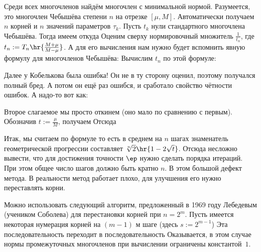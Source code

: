 \documentclass[a4paper]{article}
\begin{document}
Среди всех многочленов найдём многочлен с минимальной
нормой. Разумеется, это многочлен Чебышёва степени $n$ на отрезке
$[\mu,M]$.  Автоматически получаем $n$ корней и $n$ значений
параметров $\tau_k$. Пусть $t_k$ нули стандартного многочлена
Чебышёва.  Тогда имеем  откуда   Оценим сверху нормировочный множитель
$\frac{1}{t_n}$, где $t_n := T_n\hr{\frac{M + \mu}{M - \mu}}$.  А для
его вычисления нам нужно будет вспомнить явную формулу для многочленов
Чебышёва:   Вычислим $t_n$ по этой формуле: 
\begin{petit}
Далее у Кобелькова была ошибка! Он не в ту сторону оценил, поэтому
получался полный бред.  А потом он ещё раз ошибся, и сработало
свойство чётности ошибок.  А надо-то вот как:
\end{petit}
Второе слагаемое мы просто откинем (оно мало по сравнению с первым).
Обозначив $t := \frac{\mu}{M}$, получаем   Отсюда

Итак, мы считаем по формуле  то есть в среднем на $n$
шагах знаменатель геометрической прогрессии составляет
$\sqrt[n]{2}\hr{1-2\sqrt t}$.  Отсюда несложно вывести, что для
достижения точности $\ep$ нужно сделать порядка  итераций. При этом общее число шагов должно
быть кратно $n$. В этом большой дефект метода. В реальности метод
работает плохо, для улучшения его нужно переставлять корни.

Можно использовать следующий алгоритм, предложенный в 1969 году
Лебедевым (учеником Соболева) для перестановки корней при $n= 2^m$.
Пусть имеется некоторая нумерация корней на $(m-1)$ м шаге (здесь $s
:= 2^{m-1}$)   Эта
последовательность переходит в последовательность   Оказывается, в
этом случае нормы промежуточных многочленов при вычислении ограничены
константой~$1$.
\end{document}
